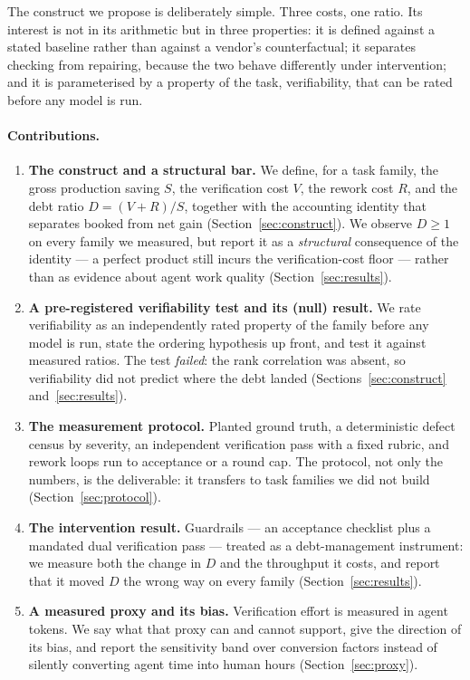 \documentclass[11pt]{article}
\newcommand{\D}{\ensuremath{D}}
\newcommand{\SV}{\ensuremath{S}}
\newcommand{\VV}{\ensuremath{V}}
\newcommand{\RV}{\ensuremath{R}}
\begin{document}
The construct we propose is deliberately simple. Three costs, one ratio. Its interest is not in
its arithmetic but in three properties: it is defined against a stated baseline rather than
against a vendor's counterfactual; it separates checking from repairing, because the two behave
differently under intervention; and it is parameterised by a property of the task, verifiability,
that can be rated before any model is run.

\paragraph{Contributions.}
\begin{enumerate}
\item \textbf{The construct and a structural bar.} We define, for a task family, the gross
production saving $\SV$, the verification cost $\VV$, the rework cost $\RV$, and the debt ratio
$\D=(\VV+\RV)/\SV$, together with the accounting identity that separates booked from net gain
(Section~\ref{sec:construct}). We observe $\D\geq 1$ on every family we measured, but report it as
a \emph{structural} consequence of the identity --- a perfect product still incurs the
verification-cost floor --- rather than as evidence about agent work quality
(Section~\ref{sec:results}).
\item \textbf{A pre-registered verifiability test and its (null) result.} We rate verifiability as
an independently rated property of the family before any model is run, state the ordering
hypothesis up front, and test it against measured ratios. The test \emph{failed}: the rank
correlation was absent, so verifiability did not predict where the debt landed
(Sections~\ref{sec:construct} and~\ref{sec:results}).
\item \textbf{The measurement protocol.} Planted ground truth, a deterministic defect census by
severity, an independent verification pass with a fixed rubric, and rework loops run to
acceptance or a round cap. The protocol, not only the numbers, is the deliverable: it transfers
to task families we did not build (Section~\ref{sec:protocol}).
\item \textbf{The intervention result.} Guardrails --- an acceptance checklist plus a mandated
dual verification pass --- treated as a debt-management instrument: we measure both the change in
$\D$ and the throughput it costs, and report that it moved $\D$ the wrong way on every family
(Section~\ref{sec:results}).
\item \textbf{A measured proxy and its bias.} Verification effort is measured in agent tokens.
We say what that proxy can and cannot support, give the direction of its bias, and report the
sensitivity band over conversion factors instead of silently converting agent time into human
hours (Section~\ref{sec:proxy}).
\end{enumerate}
\end{document}
